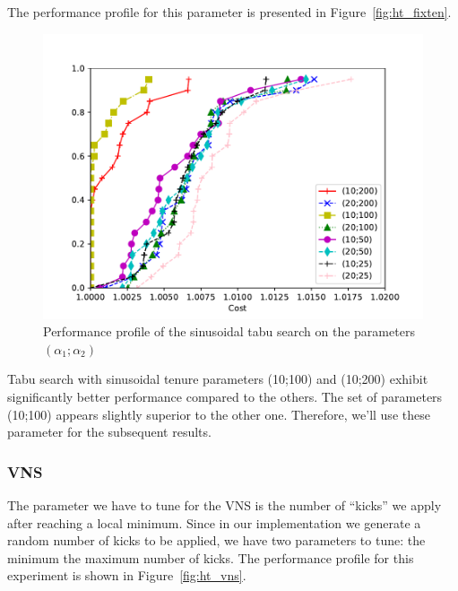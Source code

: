\documentclass{article}
\begin{document}
The performance profile for this parameter is presented in Figure~\ref{fig:ht_fixten}.

\begin{figure}[ht]
        \caption{Performance profile of the sinusoidal tabu search on the parameters $\left(\alpha_1; \alpha_2\right)$}
        \label{fig:ht_sinten}
        \centering
        \includegraphics[width=340pt]{assets/ht_sinten.pdf}
\end{figure}

Tabu search with sinusoidal tenure parameters (10;100) and (10;200) exhibit significantly better performance compared to the others.
The set of parameters (10;100) appears slightly superior to the other one. Therefore, we'll use these parameter for the
subsequent results.

\clearpage

\subsubsection{VNS}
The parameter we have to tune for the VNS is the number of ``kicks'' we apply
after reaching a local minimum. Since in our implementation we generate a
random number of kicks to be applied, we have two parameters to tune: the
minimum the maximum number of kicks.
The performance profile for this experiment is shown in Figure~\ref{fig:ht_vns}.
\end{document}

